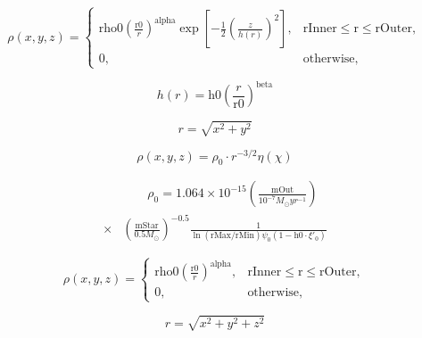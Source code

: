 \documentclass[a4paper,14pt]{extarticle}
\begin{document}
\begin{equation*}
\rho(\mathit{x},\mathit{y},\mathit{z}) = \begin{cases}
               \mathrm{rho0} \left(\frac{\mathrm{r0}}{r}\right)^\mathrm{alpha} \exp\left[-\frac{1}{2}\left(\frac{ \mathit{z}}{h(r)}\right)^2\right],       &  \mathrm{rInner} \le \mathrm{r} \le  \mathrm{rOuter}, \\
               0,& \text{otherwise},          \end{cases}
\end{equation*}

\begin{equation*}
 h(r)=\mathrm{h0}\left(\frac{r}{\mathrm{r0}}\right)^\mathrm{beta}
\end{equation*}

\begin{equation*}
 r=\sqrt{\mathit{x}^2+\mathit{y}^2}
\end{equation*}


\begin{equation*}
 \rho(\mathit{x},\mathit{y},\mathit{z}) = \rho_0 \cdot r^{-3/2}\eta(\chi)
\end{equation*}

\begin{equation*}\begin{split}
  &\qquad \rho_0= 1.064 \times 10^{-15}\left( \frac{\mathrm{mOut}}{10^{-7}M_\odot yr^{-1}}\right)\\
 \times&\left(  \frac{\mathrm{mStar}}{0.5M_\odot}\right)^{-0.5} \frac{1}{\ln (\mathrm{rMax}/\mathrm{rMin}) \psi_0 (1 - \mathrm{h0}\cdot\xi'_0)}
\end{split}\end{equation*}

\begin{equation*}
\rho(\mathit{x},\mathit{y},\mathit{z}) = \begin{cases}
               \mathrm{rho0} \left(\frac{\mathrm{r0}}{r}\right)^\mathrm{alpha},       &  \mathrm{rInner} \le \mathrm{r} \le  \mathrm{rOuter}, \\
               0,& \text{otherwise},          \end{cases}
\end{equation*}

\begin{equation*}
 r=\sqrt{\mathit{x}^2+\mathit{y}^2+\mathit{z}^2}
\end{equation*}
\end{document}
